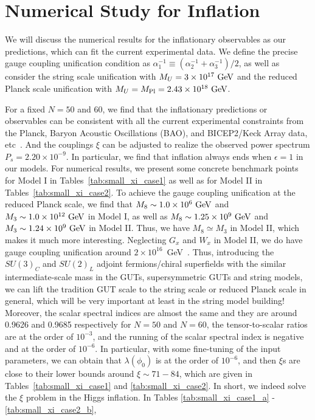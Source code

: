 \documentclass[aps,prd,preprint,superscriptaddress,showpacs,ctexart]{revtex4-1}
\begin{document}
\section{Numerical Study for Inflation}

We will discuss the numerical results for the inflationary observables
as our predictions, which can fit the current experimental data. We
define the precise gauge coupling unification condition as $\alpha_{1}^{-1}\equiv(\alpha_{2}^{-1}+\alpha_{3}^{-1})/2$,
as well as consider the string scale unification with $M_{U}=3\times10^{17}{\rm ~GeV}$
and the reduced Planck scale unification with $M_{U}=M_{{\rm Pl}}=2.43\times10^{18}{\rm ~GeV}$.

{For a fixed $N=50$ and 60, we find that the inflationary predictions
or observables can be consistent with all the current experimental
constraints from the Planck, Baryon Acoustic Oscillations (BAO), and
BICEP2/Keck Array data, etc~\cite{Ade:2015lrj,Array:2015xqh}. And
the couplings $\xi$ can be adjusted to realize the observed power
spectrum $P_{s}=2.20\times10^{-9}$. In particular, we find that inflation
always ends when $\epsilon=1$ in our models. For numerical results,
we present some concrete benchmark points for Model I in Tables~\ref{tab:small_xi_case1}
as well as for Model II in Tables~\ref{tab:small_xi_case2}. To achieve
the gauge coupling unification at the reduced Planck scale, we find
that $M_{8}\sim1.0\times10^{6}~{\rm GeV}$ and $M_{3}\sim1.0\times10^{12}~{\rm GeV}$
in Model I, as well as $M_{8}\sim1.25\times10^{9}~{\rm GeV}$ and
$M_{3}\sim1.24\times10^{9}~{\rm GeV}$ in Model II. Thus, we have
$M_{8}\simeq M_{3}$ in Model II, which makes it much more interesting.
Neglecting $G_{x}$ and $W_{x}$ in Model II, we do have gauge coupling
unification around $2\times10^{16}$~GeV~\cite{Chen:2017rpn}. Thus,
introducing the $SU(3)_{C}$ and $SU(2)_{L}$ adjoint fermions/chiral
superfields with the similar intermediate-scale mass in the GUTs,
supersymmetric GUTs and string models, we can lift the tradition GUT
scale to the string scale or reduced Planck scale in general, which
will be very important at least in the string model building! Moreover,
the scalar spectral indices are almost the same and they are around
0.9626 and 0.9685 respectively for $N=50$ and $N=60$, the tensor-to-scalar
ratios are at the order of $10^{-3}$, and the running of the scalar
spectral index is negative and at the order of $10^{-6}$. In particular,
with some fine-tuning of the input parameters, we can obtain that
$\lambda(\phi_{0})$ is at the order of $10^{-6}$, and then $\xi$s
are close to their lower bounds around $\xi\sim71-84$, which are
given in Tables~\ref{tab:small_xi_case1} and \ref{tab:small_xi_case2}.
In short, we indeed solve the $\xi$ problem in the Higgs inflation.
In Tables }\ref{tab:small_xi_case1_a} - \ref{tab:small_xi_case2_b},
\end{document}
